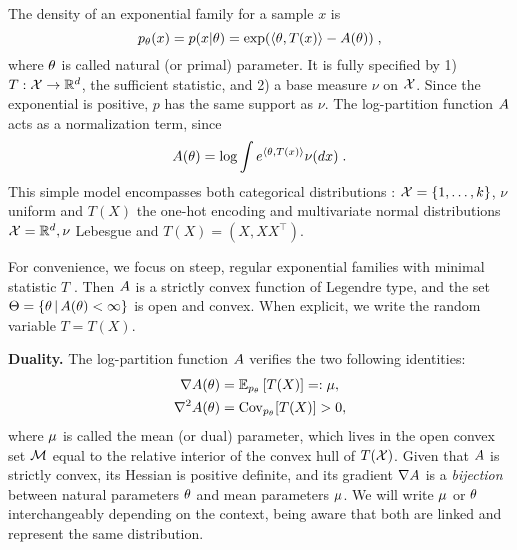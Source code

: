 The density of an exponential family for a sample $x$ is
\begin{equation}
	 p_\nat(x) = p(x|\nat) = \exp( \langle \nat, T(x) \rangle - \logpart(\nat)) \; ,
	 \label{eq:def_expfamily}
\end{equation}
where  $\nat$ is called natural (or primal) parameter.
It is fully specified by 1) $T: \cX \rightarrow \real^d$, the sufficient statistic,
and 2) a base measure $\nu$ on $\cX$.
Since the exponential is positive, $p$ has the same support as $\nu$.
The log-partition function $\logpart$ acts as a normalization term, since
\begin{align}
    \logpart(\nat) = \log \int e^{\langle \nat, T(x) \rangle} \nu(dx) \;.
\end{align}
This simple model encompasses both categorical distributions : $\cX = \{1, \dots, k\}$, $\nu$ uniform and $T(X)$  the one-hot encoding and multivariate normal distributions $\cX=\real^d, \nu$ Lebesgue and $T(X)=(X, X X^\top)$.

For convenience, we focus on steep, regular exponential families with minimal statistic $T$ \citep{barndoffnielsen2014information}.
Then $\logpart$ is a strictly convex function of Legendre type,
and the set $\Theta = \{ \nat \cond \logpart(\nat) < \infty\}$ is open and convex.
When explicit, we write the random variable $T = T(X)$.


{\bf Duality.}
The log-partition function $\logpart$ verifies the two following identities:
\begin{align}
    \nabla\logpart(\nat) &=  \expect[p_\nat]{T(X)} =: \meanp, \label{eq:mirror-map} \\
    \nabla^2 \logpart(\nat) &= \Cov_{p_\nat}[T(X)] > 0,
\end{align}
where $\meanp$ is called the mean (or dual) parameter, which lives in the open convex set $\cM$ equal to the relative interior of the convex hull of $T(\cX)$.
Given that $\logpart$ is strictly convex, its Hessian is positive definite, and its gradient $\nabla \logpart$ is a \textit{bijection} between natural parameters $\nat$ and mean parameters $\m$.
We will write $\m$ or $\nat$ interchangeably depending on the context, being aware that both are linked and represent the same distribution.

